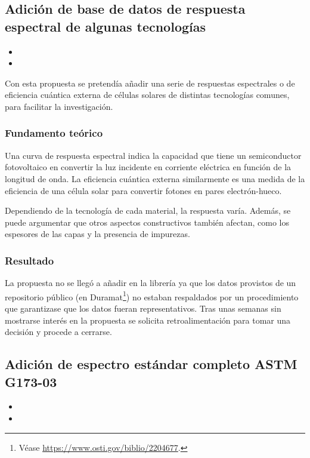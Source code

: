 \subsection{Adición de base de datos de respuesta espectral de algunas tecnologías}

\begin{itemize}
    \item {}
    \item {}
\end{itemize}

Con esta propuesta se pretendía añadir una serie de respuestas espectrales o de eficiencia cuántica externa de células solares de distintas tecnologías comunes, para facilitar la investigación.

\subsubsection{Fundamento teórico}

Una curva de respuesta espectral indica la capacidad que tiene un semiconductor fotovoltaico en convertir la luz incidente en corriente eléctrica en función de la longitud de onda. La eficiencia cuántica externa similarmente es una medida de la eficiencia de una célula solar para convertir fotones en pares electrón-hueco.

Dependiendo de la tecnología de cada material, la respuesta varía. Además, se puede argumentar que otros aspectos constructivos también afectan, como los espesores de las capas y la presencia de impurezas.

\subsubsection{Resultado}

La propuesta no se llegó a añadir en la librería ya que los datos provistos de un repositorio público (en Duramat\footnote{Véase \url{https://www.osti.gov/biblio/2204677}.}) no estaban respaldados por un procedimiento que garantizase que los datos fueran representativos. Tras unas semanas sin mostrarse interés en la propuesta se solicita retroalimentación para tomar una decisión y procede a cerrarse.

\subsection{Adición de espectro estándar completo ASTM G173-03}

\begin{itemize}
    \item {}
    \item {}
\end{itemize}

